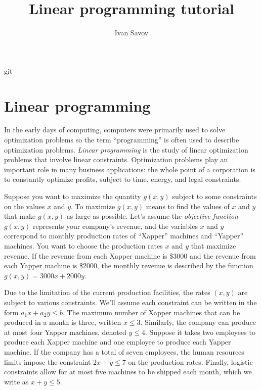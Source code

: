 \documentclass[11pt,oneside]{article}
\title{ {\huge \sc Linear programming tutorial} }
\author{Ivan Savov}
\begin{document}
\maketitle 

\vspace{-1cm}
\noindent

{ \center
	git \gitrevisionnumber 

}

\vspace{1cm}

\setcounter{tocdepth}{2}
\setcounter{secnumdepth}{2}
\tableofcontents

\vspace{1cm}

\section{Linear programming}
\label{applications:linear_programming}

	In  the early days of computing, 
	computers were primarily used to solve optimization problems
	so the term ``programming'' is often used to describe optimization problems.
	\emph{Linear programming} is the study of linear optimization problems that involve linear constraints.
	Optimization problems play an important role in many business applications:
	the whole point of a corporation is to constantly optimize profits,
	subject to time, energy, and legal constraints. 
	
	Suppose you want to maximize the quantity $g(x,y)$ subject to some constraints on the values $x$ and $y$.
	To maximize $g(x,y)$ means  to find the values of $x$ and $y$ that make $g(x,y)$ as large as possible.
	Let's assume the \emph{objective function} $g(x,y)$ represents your company's revenue,
	and the variables $x$ and $y$ correspond to monthly production rates of ``Xapper'' machines and ``Yapper'' machines.
	You want to choose the production rates $x$ and $y$ that maximize revenue.
	If the revenue from each Xapper machine is \$3000 and the revenue from each Yapper machine is \$2000,
	the monthly revenue is described by the function $g(x,y) = 3000x +  2000y$. 

	Due to the limitation of the current production facilities,
	the rates $(x,y)$ are subject to various constraints.
	We'll assume each constraint can be written in the form $a_1x+a_2y \leq b$.
	The maximum number of Xapper machines that can be produced in a month is three, written $x\leq3$.
	Similarly, the company can produce at most four Yapper machines, denoted $y \leq 4$.
	Suppose it takes two employees to produce each Xapper machine and one employee to produce each Yapper machine.
	If the company has a total of seven employees,  %
	the human resources limits impose the constraint $2x+y \leq 7$ on the production rates.
	Finally, logistic constraints allow for at most five machines to be shipped each month, which we write as $x+y \leq 5$.
\end{document}
